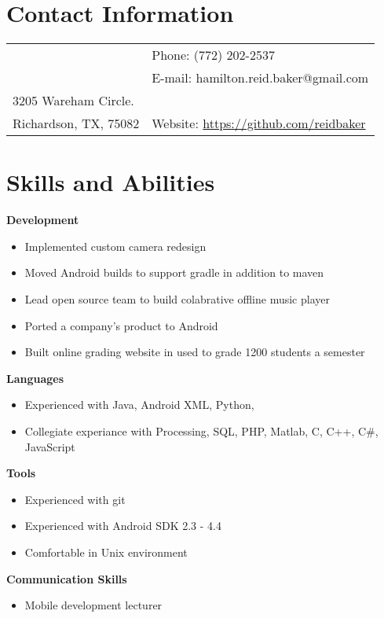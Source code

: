 \documentclass[margin,line]{res}
\begin{document}
 \hfill

\begin{resume}
\section{\sc Contact Information}
\vspace{.05in}
\begin{tabular}{@{}p{3.5in}p{3in}} & {Phone:}  (772) 202-2537 \\
& {E-mail:}  hamilton.reid.baker@gmail.com\\
3205 Wareham Circle. \\
Richardson, TX, 75082  & {Website:} \url{https://github.com/reidbaker}
\end{tabular}
 
\section{\sc Skills and Abilities}
 {\bf Development}
    \begin{itemize}
    \item Implemented custom camera redesign
    \item Moved Android builds to support gradle in addition to maven
    \item Lead open source team to build colabrative offline music player
    \item Ported a company's product to Android
    \item Built online grading website in used to grade 1200 students a
      semester
    \end{itemize}
 {\bf Languages}
    \begin{itemize}
    \item Experienced with Java, Android XML, Python, 
    \item Collegiate experiance with Processing, SQL, PHP, Matlab,  C, C++, C\#, JavaScript
    \end{itemize}
 {\bf Tools}
    \begin{itemize}
    \item Experienced with git
    \item Experienced with Android SDK 2.3 - 4.4
    \item Comfortable in Unix environment
    \end{itemize}
 {\bf Communication Skills}
    \begin{itemize}
    \item Mobile development lecturer

\end{itemize}
\end{resume}
\end{document}
